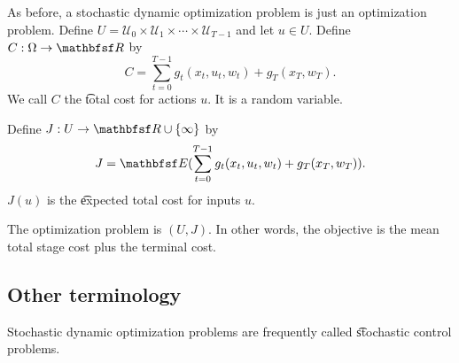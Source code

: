As before, a stochastic dynamic optimization problem is just an optimization problem.
Define $U = \mathcal{U} _0 \times  \mathcal{U} _1 \times  \cdots \times  \mathcal{U} _{T-1}$ and let $u \in U$.
Define $C: \Omega  \to \R $ by
    \[
C = \sum_{t = 0}^{T-1} g_t(x_t, u_t, w_t) + g_T(x_T, w_T).
    \]
We call $C$ the \t{total cost} for actions $u$.
It is a random variable.

Define $J: U \to \R  \cup \set{\infty}$ by
    \[
J = \E (
\sum_{t = 0}^{T-1} g_t(x_t, u_t, w_t) + g_T(x_T, w_T)
).
    \]
$J(u)$ is the \t{expected total cost} for inputs $u$.

The optimization problem is $(U, J)$.
In other words, the objective is the mean total stage cost plus the terminal cost.

\subsection*{Other terminology}

Stochastic dynamic optimization problems are frequently called \t{stochastic control problems}.
